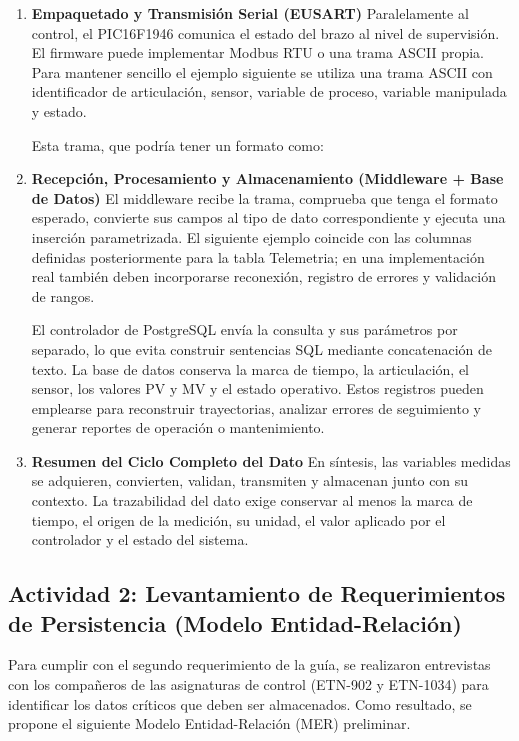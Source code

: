 \documentclass[11pt]{article}
\begin{document}
\begin{enumerate}
	\item \textbf{Empaquetado y Transmisión Serial (EUSART)} Paralelamente al control, el PIC16F1946 comunica el estado del brazo al nivel de supervisión. El firmware puede implementar Modbus RTU o una trama ASCII propia. Para mantener sencillo el ejemplo siguiente se utiliza una trama ASCII con identificador de articulación, sensor, variable de proceso, variable manipulada y estado.
	
	Esta trama, que podría tener un formato como:
	

	
	\item \textbf{Recepción, Procesamiento y Almacenamiento (Middleware + Base de Datos)} El middleware recibe la trama, comprueba que tenga el formato esperado, convierte sus campos al tipo de dato correspondiente y ejecuta una inserción parametrizada. El siguiente ejemplo coincide con las columnas definidas posteriormente para la tabla Telemetria; en una implementación real también deben incorporarse reconexión, registro de errores y validación de rangos.
	
	El controlador de PostgreSQL envía la consulta y sus parámetros por separado, lo que evita construir sentencias SQL mediante concatenación de texto. La base de datos conserva la marca de tiempo, la articulación, el sensor, los valores PV y MV y el estado operativo. Estos registros pueden emplearse para reconstruir trayectorias, analizar errores de seguimiento y generar reportes de operación o mantenimiento.
	
	\item \textbf{Resumen del Ciclo Completo del Dato} En síntesis, las variables medidas se adquieren, convierten, validan, transmiten y almacenan junto con su contexto. La trazabilidad del dato exige conservar al menos la marca de tiempo, el origen de la medición, su unidad, el valor aplicado por el controlador y el estado del sistema.
\end{enumerate}



\subsection{Actividad 2: Levantamiento de Requerimientos de Persistencia (Modelo Entidad-Relación)}

Para cumplir con el segundo requerimiento de la guía, se realizaron entrevistas con los compañeros de las asignaturas de control (ETN-902 y ETN-1034) para identificar los datos críticos que deben ser almacenados. Como resultado, se propone el siguiente Modelo Entidad-Relación (MER) preliminar.
\end{document}
